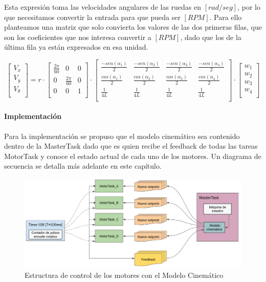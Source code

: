 Esta expresión toma las velocidades angulares de las ruedas en $[rad/seg]$, por lo que necesitamos convertir la entrada para que pueda ser $[RPM]$. Para ello planteamos una matriz que solo convierta los valores de las dos primeras filas, que son los coeficientes que nos interesa convertir a $[RPM]$, dado que los de la última fila ya están expresados en esa unidad.

$$ \begin{bmatrix} V_x \\ V_y \\ V_\theta \\ \end{bmatrix} = 
    r
    \cdot 
    \begin{bmatrix}
        {\frac{2\pi}{60}} & {0} & {0}  \\
        {0} & {\frac{2\pi}{60}} & {0} \\
        {0} & {0} & {1} \\
    \end{bmatrix}
    \cdot
    \begin{bmatrix}
        {\frac{-sen(\alpha_1)}{2}} & {\frac{-sen(\alpha_2)}{2}} & {\frac{-sen(\alpha_3)}{2}} & {\frac{-sen(\alpha_4)}{2}} \\
        {\frac{cos(\alpha_1)}{2}}  & {\frac{cos(\alpha_2)}{2}}  & {\frac{cos(\alpha_3)}{2}}  & {\frac{cos(\alpha_4)}{2}}  \\
        {\frac{1}{4L}}  & {\frac{1}{4L}}  & {\frac{1}{4L}}  & {\frac{1}{4L}}  \\
    \end{bmatrix}
    \cdot
    \begin{bmatrix} w_1 \\ w_2 \\ w_3 \\ w_4 \\ \end{bmatrix} $$


\paragraph{Implementación} \mbox{} \vspace{8pt}

Para la implementación se propuso que el modelo cinemático sea contenido dentro de la MasterTask dado que es quien recibe el feedback de todas las tareas MotorTask y conoce el estado actual de cada uno de los motores. Un diagrama de secuencia se detalla más adelante en este capítulo.

\begin{figure}[H]
    \centering
    \hspace*{-0.75cm}
    \includegraphics[width=1.1\linewidth]{images/diag_comp_esp32_modelo_cinem.png}
    \caption{Estructura de control de los motores con el Modelo Cinemático}
    \label{fig:diagcomponentesp32modelocinem}
\end{figure}
